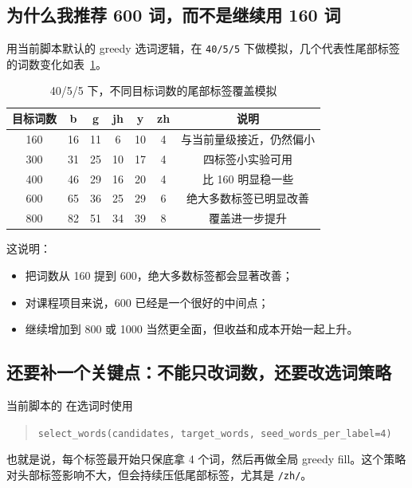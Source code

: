 \documentclass[11pt,a4paper]{ctexart}
\begin{document}
\subsection{为什么我推荐 600 词，而不是继续用 160 词}

用当前脚本默认的 greedy 选词逻辑，在 \texttt{40/5/5} 下做模拟，几个代表性尾部标签的词数变化如表~\ref{tab:coverage-sim}。

\begin{table}[H]
    \centering
    \caption{40/5/5 下，不同目标词数的尾部标签覆盖模拟}
    \label{tab:coverage-sim}
    \begin{tabular}{ccccccc}
        \toprule
        目标词数 & b & g & jh & y & zh & 说明 \\
        \midrule
        160 & 16 & 11 & 6 & 10 & 4 & 与当前量级接近，仍然偏小 \\
        300 & 31 & 25 & 10 & 17 & 4 & 四标签小实验可用 \\
        400 & 46 & 29 & 16 & 20 & 4 & 比 160 明显稳一些 \\
        600 & 65 & 36 & 25 & 29 & 6 & 绝大多数标签已明显改善 \\
        800 & 82 & 51 & 34 & 39 & 8 & 覆盖进一步提升 \\
        \bottomrule
    \end{tabular}
\end{table}

这说明：
\begin{itemize}[nosep]
    \item 把词数从 160 提到 600，绝大多数标签都会显著改善；
    \item 对课程项目来说，600 已经是一个很好的中间点；
    \item 继续增加到 800 或 1000 当然更全面，但收益和成本开始一起上升。
\end{itemize}

\subsection{还要补一个关键点：不能只改词数，还要改选词策略}

当前脚本的  在选词时使用
\begin{quote}
\texttt{select\_words(candidates, target\_words, seed\_words\_per\_label=4)}
\end{quote}

也就是说，每个标签最开始只保底拿 4 个词，然后再做全局 greedy fill。这个策略对头部标签影响不大，但会持续压低尾部标签，尤其是 \texttt{/zh/}。
\end{document}
